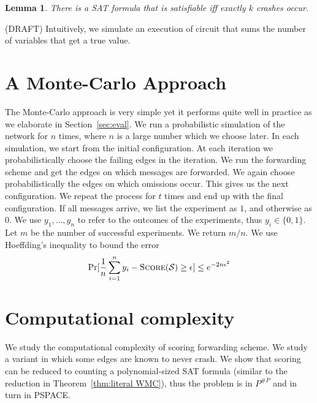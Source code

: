 \documentclass[11pt,eepic]{article}
\newcommand{\set}[1]{\{ #1  \}}
\renewcommand{\S}{{\cal S}}
\newcommand{\score}{\mbox{\sc Score}}
\newtheorem{lemma}[theorem]{Lemma}
\def\eod{\vrule height 6pt width 5pt depth 0pt}
\newenvironment{proof}{\noindent {\bf Proof:} \hspace{.677em}}
	                      {\hspace*{\fill}{\eod}}
\begin{document}
		\begin{lemma}
		\label{lem:k crash sat}
		There is a SAT formula that is satisfiable iff exactly $k$ crashes occur.
		\end{lemma}
		\begin{proof}
		(DRAFT) Intuitively, we simulate an execution of circuit that sums the number of variables that get a true value.
		\end{proof}




\section{A Monte-Carlo Approach}
\label{sec:monte-carlo}
	The Monte-Carlo approach is very simple yet it performs quite well in practice as we elaborate in Section~\ref{sec:eval}. We run a probabilistic simulation of the network for $n$ times, where $n$ is a large number which we choose later. In each simulation, we start from the initial configuration. At each iteration we probabilistically choose the failing edges in the iteration. We run the forwarding scheme and get the edges on which messages are forwarded. We again choose probabilistically the edges on which omissions occur. This gives us the next configuration. We repeat the process for $t$ times and end up with the final configuration. If all messages arrive, we list the experiment as $1$, and otherwise as $0$. We use $y_1, \ldots, y_n$ to refer to the outcomes of the experiments, thus $y_i \in \set{0,1}$. Let $m$ be the number of successful experiments. We return $m/n$. We use Hoeffding's inequality to bound the error \[\Pr[\frac{1}{n}\sum_{i=1}^n y_i - \score(\S) \geq \epsilon] \leq e^{-2n\epsilon^2}\]





\section{Computational complexity}
	We study the computational complexity of scoring forwarding scheme. We study a variant in which some edges are known to never crash. We show that scoring can be reduced to counting a polynomial-sized SAT formula (similar to the reduction in Theorem~\ref{thm:literal WMC}), thus the problem is in $P^{\#P}$ and in turn in PSPACE.
\end{document}
